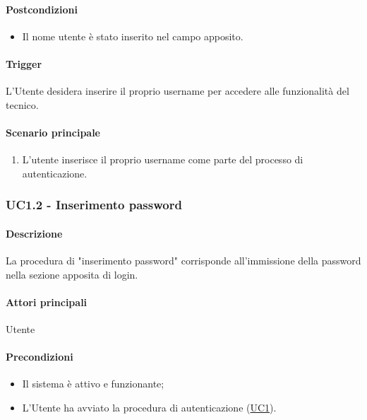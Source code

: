 \paragraph*{Postcondizioni}
\begin{itemize}
  \item Il nome utente è stato inserito nel campo apposito.
\end{itemize}

\paragraph*{Trigger}
L'Utente desidera inserire il proprio username per accedere alle funzionalità del tecnico.

\paragraph*{Scenario principale}
\begin{enumerate}
  \item L'utente inserisce il proprio username come parte del processo di autenticazione.
\end{enumerate}


\subsubsection{UC1.2 - Inserimento password}\label{UC1point2}
\paragraph*{Descrizione}
La procedura di "inserimento password" corrisponde all'immissione della password nella sezione apposita di login.

\paragraph*{Attori principali}
Utente

\paragraph*{Precondizioni}
\begin{itemize}
  \item Il sistema è attivo e funzionante;
  \item L'Utente ha avviato la procedura di autenticazione (\hyperref[UC1]{UC1}). 
\end{itemize}

